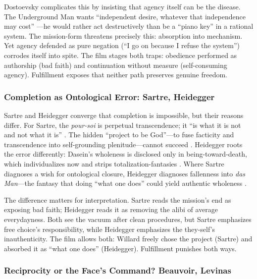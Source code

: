 Dostoevsky complicates this by insisting that agency itself can be the disease. The
Underground Man wants ``independent desire, whatever that independence may cost''
\parencite[p.~131]{DostoevskyNFU1994}---he would rather act destructively than be a ``piano
key'' in a rational system. The mission-form threatens precisely this: absorption into
mechanism. Yet agency defended as pure negation (``I go on because I refuse the system'')
corrodes itself into spite. The film stages both traps: obedience performed as authorship
(bad faith) and continuation without measure (self-consuming agency). Fulfillment exposes that
neither path preserves genuine freedom.

\subsubsection*{Completion as Ontological Error: Sartre, Heidegger}

Sartre and Heidegger converge that completion is impossible, but their reasons differ. For
Sartre, the \emph{pour-soi} is perpetual transcendence; it ``is what it is not and not what
it is'' \parencite[pp.~100--110]{SartreBN2003}. The hidden ``project to be God''---to fuse
facticity and transcendence into self-grounding plenitude---cannot succeed
\parencite[pp.~586--604]{SartreBN2003}. Heidegger roots the error differently: Dasein's
wholeness is disclosed only in being-toward-death, which individualizes now and strips
totalization-fantasies \parencite[pp.~294--307]{HeideggerBT1962}. Where Sartre diagnoses a
wish for ontological closure, Heidegger diagnoses fallenness into \emph{das Man}---the fantasy
that doing ``what one does'' could yield authentic wholeness
\parencite[pp.~149--168]{HeideggerBT1962}.

The difference matters for interpretation. Sartre reads the mission's end as exposing bad
faith; Heidegger reads it as removing the alibi of average everydayness. Both see the vacuum
after clean procedures, but Sartre emphasizes free choice's responsibility, while Heidegger
emphasizes the they-self's inauthenticity. The film allows both: Willard freely chose the
project (Sartre) and absorbed it as ``what one does'' (Heidegger). Fulfillment punishes both
ways.

\subsubsection*{Reciprocity or the Face's Command? Beauvoir, Levinas}

